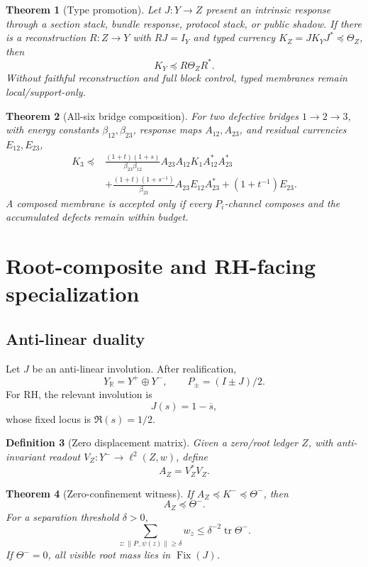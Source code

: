 \documentclass[11pt]{article}
\newtheorem{theorem}{Theorem}[section]
\newtheorem{definition}[theorem]{Definition}
\DeclareMathOperator{\tr}{tr}
\DeclareMathOperator{\Fix}{Fix}
\begin{document}
\begin{theorem}[Type promotion]
Let \(J:Y\to Z\) present an intrinsic response through a section stack, bundle response, protocol stack, or public shadow.  If there is a reconstruction \(R:Z\to Y\) with \(RJ=I_Y\) and typed currency \(K_Z=J K_YJ^*\preceq\Theta_Z\), then
\[
  K_Y\preceq R\Theta_ZR^*.
\]
Without faithful reconstruction and full block control, typed membranes remain local/support-only.
\end{theorem}

\begin{theorem}[All-six bridge composition]
For two defective bridges \(1\to2\to3\), with energy constants \(\beta_{12},\beta_{23}\), response maps \(A_{12},A_{23}\), and residual currencies \(E_{12},E_{23}\),
\[
\begin{aligned}
K_3\preceq{}&\frac{(1+t)(1+s)}{\beta_{23}\beta_{12}}A_{23}A_{12}K_1A_{12}^*A_{23}^*\\
&+\frac{(1+t)(1+s^{-1})}{\beta_{23}}A_{23}E_{12}A_{23}^*+(1+t^{-1})E_{23}.
\end{aligned}
\]
A composed membrane is accepted only if every \(P_i\)-channel composes and the accumulated defects remain within budget.
\end{theorem}

\section{Root-composite and RH-facing specialization}

\subsection{Anti-linear duality}
Let \(J\) be an anti-linear involution.  After realification,
\[
  Y_\mathbb R=Y^+\oplus Y^-,
  \qquad P_\pm=(I\pm J)/2.
\]
For RH, the relevant involution is
\[
  J(s)=1-\overline{s},
\]
whose fixed locus is \(\Re(s)=1/2\).

\begin{definition}[Zero displacement matrix]
Given a zero/root ledger \(Z\), with anti-invariant readout \(V_Z:Y^-\to\ell^2(Z,w)\), define
\[
  A_Z=V_Z^*V_Z.
\]
\end{definition}

\begin{theorem}[Zero-confinement witness]
If \(A_Z\preceq K^-\preceq\Theta^-\), then
\[
  A_Z\preceq\Theta^-.
\]
For a separation threshold \(\delta>0\),
\[
  \sum_{z:\|P_-\psi(z)\|\ge\delta}w_z\le \delta^{-2}\tr\Theta^-.
\]
If \(\Theta^-=0\), all visible root mass lies in \(\Fix(J)\).
\end{theorem}
\end{document}
